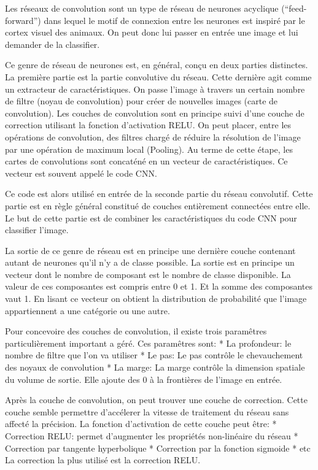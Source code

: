 \documentclass[a4paper,10pt,openany,oneside]{sphinxmanual}
\begin{document}
Les réseaux de convolution sont un type de réseau de neurones acyclique (``feed-forward'') dans lequel le motif de connexion entre les neurones
est inspiré par le cortex visuel des animaux. On peut donc lui passer en entrée une image et lui demander de la classifier.

Ce genre de réseau de neurones est, en général, conçu en deux parties distinctes. La première partie est la partie convolutive du réseau.
Cette dernière agit comme un extracteur de caractéristiques. On passe l'image à travers un certain nombre de filtre (noyau de convolution)
pour créer de nouvelles images (carte de convolution). Les couches de convolution sont en principe suivi d'une couche de correction
utilisant la fonction d'activation RELU. On peut placer, entre les opérations de convolution, des filtres chargé de réduire la résolution
de l'image par une opération de maximum local (Pooling). Au terme de cette étape, les cartes de convolutions sont concaténé en un vecteur
de caractéristiques. Ce vecteur est souvent appelé le code CNN.

Ce code est alors utilisé en entrée de la seconde partie du réseau convolutif. Cette partie est en règle général constitué de couches
entièrement connectées entre elle. Le but de cette partie est de combiner les caractéristiques du code CNN pour classifier l'image.

La sortie de ce genre de réseau est en principe une dernière couche contenant autant de neurones qu'il n'y a de classe possible. La sortie est
en principe un vecteur dont le nombre de composant est le nombre de classe disponible. La valeur de ces composantes est compris entre 0 et 1.
Et la somme des composantes vaut 1. En lisant ce vecteur on obtient la distribution de probabilité que l'image appartiennent a une catégorie
ou une autre.

Pour concevoire des couches de convolution, il existe trois paramêtres particulièrement important a géré. Ces paramêtres sont:
* La profondeur: le nombre de filtre que l'on va utiliser
* Le pas: Le pas contrôle le chevauchement des noyaux de convolution
* La marge: La marge contrôle la dimension spatiale du volume de sortie. Elle ajoute des 0 à la frontières de l'image en entrée.

Après la couche de convolution, on peut trouver une couche de correction. Cette couche semble permettre d'accélerer la vitesse de traitement
du réseau sans affecté la précision. La fonction d'activation de cette couche peut être:
* Correction RELU: permet d'augmenter les propriétés non-linéaire du réseau
* Correction par tangente hyperbolique
* Correction par la fonction sigmoide
* etc
La correction la plus utilisé est la correction RELU.
\end{document}
